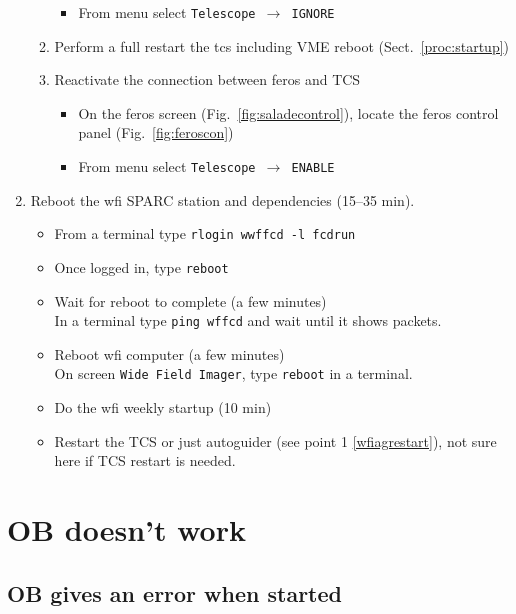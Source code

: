 \documentclass[11pt,fleqn]{book} %
\begin{document}
\begin{enumerate}
\begin{enumerate}
\begin{itemize}
                \item From menu select \texttt{Telescope $\rightarrow$ IGNORE}
           \end{itemize}
       \item Perform a full restart the \gls{tcs} including VME reboot (Sect.~\ref{proc:startup})
       \item Reactivate the connection between \gls{feros} and TCS
           \begin{itemize}
                \item On the \gls{feros} screen (Fig.~\ref{fig:saladecontrol}), locate the \gls{feros} control panel (Fig.~\ref{fig:feroscon})
                \item From menu select \texttt{Telescope $\rightarrow$ ENABLE}
           \end{itemize}
    \end{enumerate}
  \item Reboot the \gls{wfi} SPARC station and dependencies (15--35 min).
    \begin{itemize}
        \item From a terminal type \texttt{rlogin wwffcd -l fcdrun}
        \item Once logged in, type \texttt{reboot}
        \item Wait for reboot to complete (a few minutes)\\
              In a terminal type \texttt{ping wffcd} and wait until it shows packets.
        \item Reboot \gls{wfi} computer (a few minutes)\\
              On screen \texttt{Wide Field Imager}, type \texttt{reboot} in a terminal.
        \item Do the \gls{wfi} weekly startup (10 min)
        \item Restart the TCS or just autoguider (see point 1 \ref{wfiagrestart}), not sure here if TCS restart is needed.
    \end{itemize}
\end{enumerate}

\section{OB doesn't work}

\subsection{OB gives an error when started}
\end{document}
